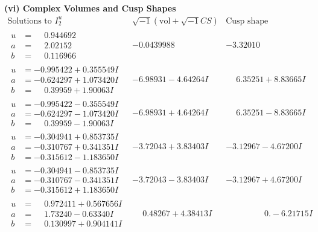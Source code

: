\documentclass[1p]{elsarticle_modified}
\theoremstyle{definition}
\newcommand{\I}{\sqrt{-1}}
\begin{document}
\newpage\flushleft \textbf{(vi) Complex Volumes and Cusp Shapes}
$$\begin{array}{c|c|c}  
\text{Solutions to }I^u_{2}& \I (\text{vol} + \sqrt{-1}CS) & \text{Cusp shape}\\
 \hline 
\begin{aligned}
u &= \phantom{-}0.944692\phantom{ +0.000000I} \\
a &= \phantom{-}2.02152\phantom{ +0.000000I} \\
b &= \phantom{-}0.116966\phantom{ +0.000000I}\end{aligned}
 & -0.0439988\phantom{ +0.000000I} & -3.32010\phantom{ +0.000000I} \\ \hline\begin{aligned}
u &= -0.995422 + 0.355549 I \\
a &= -0.624297 + 1.073420 I \\
b &= \phantom{-}0.39959 + 1.90063 I\end{aligned}
 & -6.98931 - 4.64264 I & \phantom{-}6.35251 + 8.83665 I \\ \hline\begin{aligned}
u &= -0.995422 - 0.355549 I \\
a &= -0.624297 - 1.073420 I \\
b &= \phantom{-}0.39959 - 1.90063 I\end{aligned}
 & -6.98931 + 4.64264 I & \phantom{-}6.35251 - 8.83665 I \\ \hline\begin{aligned}
u &= -0.304941 + 0.853735 I \\
a &= -0.310767 + 0.341351 I \\
b &= -0.315612 - 1.183650 I\end{aligned}
 & -3.72043 + 3.83403 I & -3.12967 - 4.67200 I \\ \hline\begin{aligned}
u &= -0.304941 - 0.853735 I \\
a &= -0.310767 - 0.341351 I \\
b &= -0.315612 + 1.183650 I\end{aligned}
 & -3.72043 - 3.83403 I & -3.12967 + 4.67200 I \\ \hline\begin{aligned}
u &= \phantom{-}0.972411 + 0.567656 I \\
a &= \phantom{-}1.73240 - 0.63340 I \\
b &= \phantom{-}0.130997 + 0.904141 I\end{aligned}
 & \phantom{-}0.48267 + 4.38413 I & \phantom{-0.000000 } 0. - 6.21715 I \\ \hline\begin{aligned}

\end{aligned}
\end{array}$$
\end{document}
